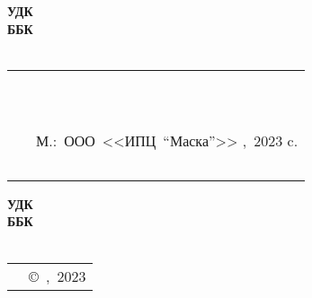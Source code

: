 {
\thispagestyle{empty}
%
\small{
\begin{flushleft}
\textbf{%
	УДК \UDK \\
	ББК \BBK \\
	\BibCode \\
}
\end{flushleft}
%
\vspace{3cm}
%
\begin{flushright}
{
\begin{tabular}[c]{>{\raggedright}m{14mm} >{\raggedright}m{95mm} }
	\textbf{\BibCode} & \MyVarAuthorName \tabularnewline
	~ & \MyVarBookName \tabularnewline
	~ & \MyVarBookNamesec \tabularnewline
	~ & М.:~ООО~<<ИПЦ~"`Маска"'>> ,~2023\mdash \pageref{LastPage} c. \tabularnewline
	~ & \textbf{\ISBN}
\end{tabular}
}
\end{flushright}
%
\vspace{4.0cm}
%
\begin{flushright}
\textbf{%
	УДК \UDK \\
	ББК \BBK \\
	\BibCode \\
}
\end{flushright}
%
\vspace{1.0cm}
%
}
{
\begin{longtable}[c]{>{\raggedright}m{55mm} >{\raggedleft}m{55mm} }
	\textbf{\ISBN} & {\copyright~\MyVarAuthorName,~2023} \tabularnewline
\end{longtable}
}
}